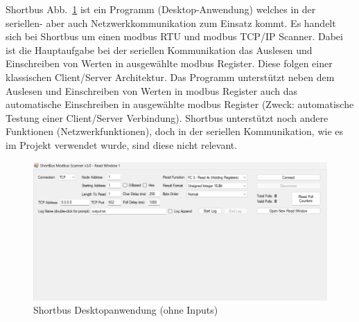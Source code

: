 Shortbus Abb.~\ref{fig:Shortbusfenster} ist ein Programm (Desktop-Anwendung) welches in der seriellen- aber auch Netzwerkkommunikation zum Einsatz kommt. 
Es handelt sich bei Shortbus um einen \gls{modbus} RTU und \gls{modbus} TCP/IP Scanner.
Dabei ist die Hauptaufgabe bei der seriellen Kommunikation das Auslesen und Einschreiben von Werten in ausgewählte \gls{modbus} Register. Diese folgen einer klassischen Client/Server Architektur.
Das Programm unterstützt neben dem Auslesen und Einschreiben von Werten in \gls{modbus} Register auch das  automatische Einschreiben in ausgewählte \gls{modbus} Register (Zweck: automatische Testung einer Client/Server Verbindung).
Shortbus unterstützt noch andere Funktionen (Netzwerkfunktionen), doch in der seriellen Kommunikation, wie es im Projekt verwendet wurde, sind diese nicht relevant.
\cite[vgl.][]{software.informer:2024}

\begin{figure}[H]
	\centering
	\includegraphics[width=1\linewidth]{Bilder/shortbus_fenster}
	\caption{Shortbus Desktopanwendung (ohne Inputs)} 
	\label{fig:Shortbusfenster}
\end{figure}

